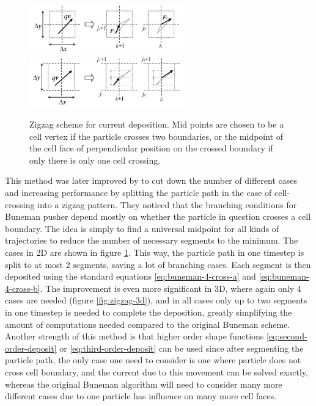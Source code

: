 \begin{figure}[h]
  \centering
  \includegraphics[width=0.6\textwidth]{pics/chap1/umeda-1.png}\\
  \includegraphics[width=0.6\textwidth]{pics/chap1/umeda-2.png}
  \caption[Zigzag scheme for current deposition.]{Zigzag scheme for current
    deposition. Mid points are chosen to be a cell vertex if the particle
    crosses two boundaries, or the midpoint of the cell face of perpendicular
    position on the crossed boundary if only there is only one cell crossing.
    \cite{umeda_new_2003}}
  \label{fig:zigzag-2d}
\end{figure}

This method was later improved by \citet{umeda_new_2003} to cut down the number
of different cases and increasing performance by splitting the particle path in
the case of cell-crossing into a zigzag pattern. They noticed that the branching
conditions for Buneman pusher depend mostly on whether the particle in question
crosses a cell boundary. The idea is simply to find a universal midpoint for all
kinds of trajectories to reduce the number of necessary segments to the minimum.
The cases in 2D are shown in figure \ref{fig:zigzag-2d}. This way, the particle
path in one timestep is split to at most 2 segments, saving a lot of branching
cases. Each segment is then deposited using the standard equations
\eqref{eq:buneman-4-cross-a} and \eqref{eq:buneman-4-cross-b}. The improvement
is even more significant in 3D, where again only 4 cases are needed (figure
\ref{fig:zigzag-3d}), and in all cases only up to two segments in one timestep
is needed to complete the deposition, greatly simplifying the amount of
computations needed compared to the original Buneman scheme. Another strength of
this method is that higher order shape functions \eqref{eq:second-order-deposit}
or \eqref{eq:third-order-deposit} can be used since after segmenting the
particle path, the only case one need to consider is one where particle does not
cross cell boundary, and the current due to this movement can be solved exactly,
whereas the original Buneman algorithm will need to consider many more different
cases due to one particle has influence on many more cell faces.


